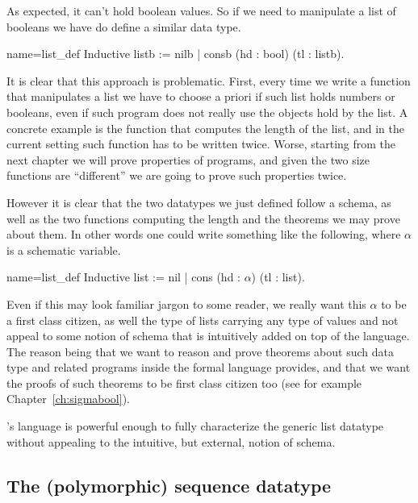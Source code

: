 As expected, it can't hold boolean values.  So if we need to
manipulate a list of booleans we have do define a similar data type.

\begin{coq}{name=list_def}{}
Inductive listb := nilb | consb (hd : bool) (tl : listb).
\end{coq}

It is clear that this approach is problematic.  First, every time we
write a function that manipulates a list we have to choose a priori
if such list holds numbers or booleans, even if such program does not
really use the objects hold by the list.
A concrete example is the function that computes the length of the list,
and in the current setting such function has to be written twice.
Worse, starting from the next chapter we will prove properties of programs,
and given the two size functions are ``different'' we are going to prove such
properties twice.

However it is clear that the two datatypes we just defined follow
a schema, as well as the two functions computing the length and the
theorems we may prove about them.  In other words one could write something
like the following, where $\alpha$ is a schematic variable.

\begin{coq}{name=list_def}{}
Inductive list := nil | cons (hd : $\alpha$) (tl : list).
\end{coq}

\noindent Even if this may look familiar jargon to some reader, we really want
this $\alpha$ to be a first class citizen, as well the type of lists carrying
any type of values and not appeal to some notion of schema that is intuitively
added on top of the \Coq{} language.  The reason being that we want to 
reason and
prove theorems about such data type and related programs inside the formal
language \Coq{} provides, and that we want the proofs of such 
theorems to be first
class citizen too (see for example Chapter~\ref{ch:sigmabool}).

\Coq{}'s language is powerful enough to fully characterize the generic 
list datatype without appealing to the intuitive, but external, notion of
schema.

\subsection{The (polymorphic) sequence datatype}

